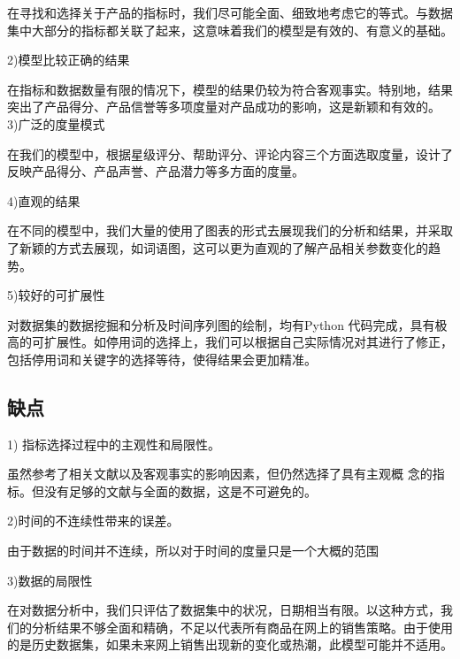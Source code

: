 \documentclass[UTF8]{article}
\begin{document}
在寻找和选择关于产品的指标时，我们尽可能全面、细致地考虑它的等式。与数据集中大部分的指标都关联了起来，这意味着我们的模型是有效的、有意义的基础。

2)模型比较正确的结果

在指标和数据数量有限的情况下，模型的结果仍较为符合客观事实。特别地，结果突出了产品得分、产品信誉等多项度量对产品成功的影响，这是新颖和有效的。
3)广泛的度量模式

在我们的模型中，根据星级评分、帮助评分、评论内容三个方面选取度量，设计了反映产品得分、产品声誉、产品潜力等多方面的度量。

4)直观的结果

在不同的模型中，我们大量的使用了图表的形式去展现我们的分析和结果，并采取了新颖的方式去展现，如词语图，这可以更为直观的了解产品相关参数变化的趋势。

5)较好的可扩展性

对数据集的数据挖掘和分析及时间序列图的绘制，均有Python 代码完成，具有极高的可扩展性。如停用词的选择上，我们可以根据自己实际情况对其进行了修正，包括停用词和关键字的选择等待，使得结果会更加精准。

\subsection{缺点}
1) 指标选择过程中的主观性和局限性。

虽然参考了相关文献以及客观事实的影响因素，但仍然选择了具有主观概
念的指标。但没有足够的文献与全面的数据，这是不可避免的。

2)时间的不连续性带来的误差。

由于数据的时间并不连续，所以对于时间的度量只是一个大概的范围

3)数据的局限性

在对数据分析中，我们只评估了数据集中的状况，日期相当有限。以这种方式，我们的分析结果不够全面和精确，不足以代表所有商品在网上的销售策略。由于使用的是历史数据集，如果未来网上销售出现新的变化或热潮，此模型可能并不适用。






\end{document}
